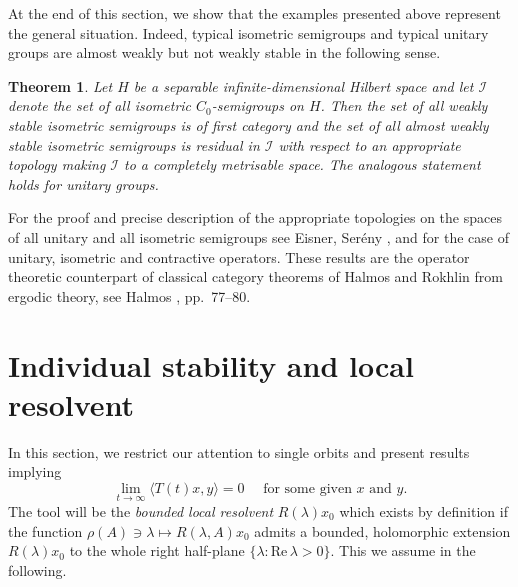 \documentclass[11pt,intlimits, draft,oneside]{amsart}
\newtheorem{thm}{Theorem}[section]
\theoremstyle{definition}
\renewcommand{\Re}{\mathrm{Re}\,}
\begin{document}
At the end of this section, we show that the examples presented
above represent the general situation. Indeed, typical isometric semigroups and typical unitary groups are almost
weakly but not weakly stable in the following sense. 
%
\begin{thm}\label{thm:category}
Let $H$ be a separable infinite-dimensional Hilbert space and let
$\mathcal{I}$ denote the set of all isometric $C_0$-semigroups on
$H$. Then the set of all weakly stable isometric semigroups is of
first category and the set of all almost weakly stable isometric
semigroups is residual in $\mathcal{I}$ with respect to an 
appropriate topology making  $\mathcal{I}$ to a completely metrisable space. 
The analogous statement holds for unitary groups.
\end{thm}
%
\noindent For the proof and precise description of the appropriate
topologies on the spaces of all unitary and all isometric semigroups 
see Eisner, Ser\'eny \cite{eisner/sereny-cont:2006}, and
\cite{eisner/sereny:2006} for the case of unitary, isometric and
contractive operators. These results are the operator theoretic
counterpart of classical category theorems of Halmos and Rokhlin
from ergodic theory, see Halmos \cite{halmos:1956}, pp.~77--80.


\section{Individual stability and local resolvent} \label{section:individual_stability}


In this section, we restrict our attention to single orbits and
present results implying
%
\begin{equation*}
\lim_{t\to\infty} \langle T(t)x, y \rangle =0 \quad \text{ for some given  } x \text {  and } y. 
\end{equation*}
%
%
The tool will be the \emph{bounded local resolvent} $R(\lambda)x_0$
which exists by definition if the function $\rho(A)\ni\lambda\mapsto
R(\lambda,A)x_0$ admits a bounded, holomorphic extension
$R(\lambda)x_0$ to the whole right half-plane $\{\lambda:\Re \lambda
>0\}$. This we assume in the following.
\end{document}
